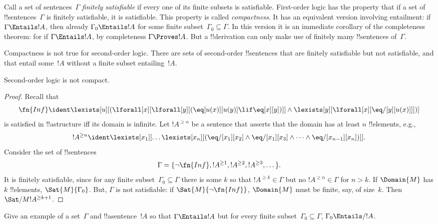\documentclass[../../../include/open-logic-section]{subfiles}
\begin{document}

\begin{explain}
Call a set of sentences~$\Gamma$ \emph{finitely satisfiable} if every
one of its finite subsets is satisfiable.  First-order logic has the
property that if a set of !!{sentence}s~$\Gamma$ is finitely
satisfiable, it is satisfiable.  This property is called
\emph{compactness}.  It has an equivalent version involving
entailment: if $\Gamma \Entails !A$, then already $\Gamma_0 \Entails
!A$ for some finite subset~$\Gamma_0 \subseteq \Gamma$. In this
version it is an immediate corollary of the completeness theorem: for
if $\Gamma \Entails !A$, by completeness $\Gamma \Proves !A$. But a
!!{derivation} can only make use of finitely many !!{sentence}s
of~$\Gamma$.

Compactness is not true for second-order logic. There are sets of
second-order !!{sentence}s that are finitely satisfiable but not
satisfiable, and that entail some~$!A$ without a finite subset
entailing~$!A$.  
\end{explain}


\begin{thm}
Second-order logic is not compact.
\end{thm}

\begin{proof}
Recall that 
\[
\fn{Inf} \ident \lexists[u][(\lforall[x][\lforall[y][(\eq[u(x)][u(y)]
      \lif \eq[x][y])]] \land \lexists[y][\lforall[x][\eq/[y][u(x)]]])]
\]
is satisfied in !!a{structure} iff its domain is infinite. Let
$!A^{\ge n}$ be a sentence that asserts that the domain has at least
$n$ !!{element}s, e.g.,
\[
!A^{\ge n} \ident \lexists[x_1][\dots\lexists[x_n][(\eq/[x_1][x_2]
    \land \eq/[x_1][x_3] \land \dots \land \eq/[x_{n-1}][x_n])]].
\]
Consider the set of !!{sentence}s
\[
\Gamma = \{\lnot \fn{Inf}, !A^{\ge 1}, !A^{\ge 2}, !A^{\ge 3}, \dots\}.
\]
It is finitely satisfiable, since for any finite subset~$\Gamma_0
\subseteq \Gamma$
there is some $k$ so that $!A^{\ge k} \in \Gamma$ but no $!A^{\ge n}
\in \Gamma$ for $n>k$. If $\Domain{M}$ has $k$ !!{element}s,
$\Sat{M}{\Gamma_0}$. But, $\Gamma$ is not satisfiable: if
$\Sat{M}{\lnot \fn{Inf}}$, $\Domain{M}$ must be finite, say, of
size~$k$. Then $\Sat/{M}{!A^{\ge k+1}}$.
\end{proof}

\begin{prob}
Give an example of a set~$\Gamma$ and !!a{sentence}~$!A$ so that
$\Gamma \Entails !A$ but for every finite subset~$\Gamma_0 \subseteq
\Gamma$, $\Gamma_0 \Entails/ !A$.
\end{prob}
\end{document}
